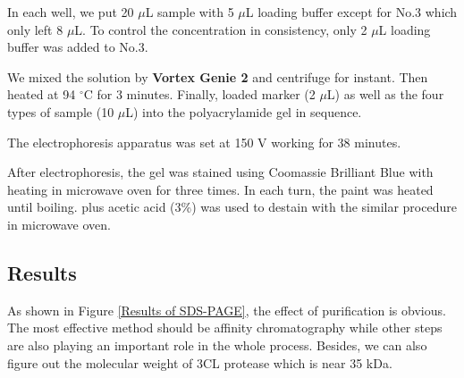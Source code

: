 \documentclass{report}
\begin{document}
In each well, we put 20 $\mu$L sample with 5 $\mu$L loading buffer except for No.3 which only left 8 $\mu$L.
To control the concentration in consistency, only 2 $\mu$L loading buffer was added to No.3.

We mixed the solution by \textbf{Vortex Genie 2} and centrifuge for instant.
Then heated at 94 $^\circ$C for 3 minutes.
Finally, loaded marker (2 $\mu$L) as well as the four types of sample (10 $\mu$L) into the polyacrylamide gel in sequence.

The electrophoresis apparatus was set at 150 V working for 38 minutes.

After electrophoresis, the gel was stained using Coomassie Brilliant Blue with heating in microwave oven for three times.
In each turn, the paint was heated until boiling.
 plus acetic acid (3\%) was used to destain with the similar procedure in microwave oven.

\subsection{Results}
As shown in Figure \ref{Results of SDS-PAGE}, the effect of purification is obvious.
The most effective method should be affinity chromatography while other steps are also playing an important role in the whole process.
Besides, we can also figure out the molecular weight of 3CL protease which is near 35 kDa.
\end{document}

